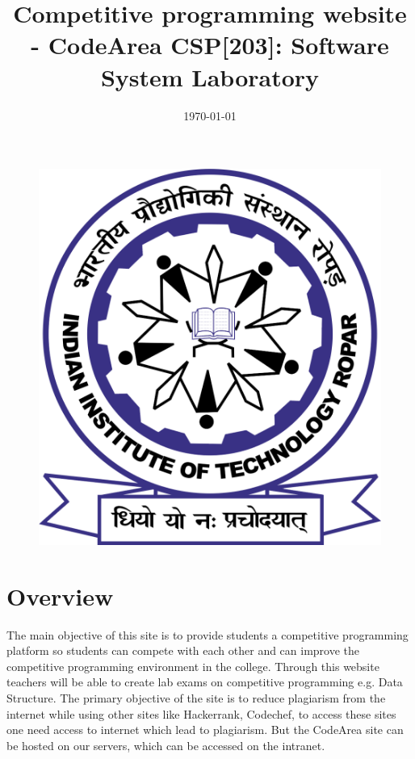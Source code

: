 \documentclass{article}
\title{Competitive programming website - CodeArea
        CSP[203]: Software System Laboratory}
\date{\today}
\begin{document}
\maketitle

\begin{table}[h!]
    \begin{center}
    \end{center}
\end{table}

\vspace{2cm}

\begin{figure}[h!]
    \centering
    \includegraphics[width=0.4\linewidth]{rpr_logo.jpg}
\end{figure}


\newpage


\section{Overview}
The main objective of this site is to provide students a competitive programming platform so students can compete with each other and can improve the competitive programming environment in the college. Through this website teachers will be able to create lab exams on competitive programming e.g. Data Structure.
The primary objective of the site is to reduce plagiarism from the internet while using other sites like Hackerrank, Codechef, to access these sites one need access to internet which lead to plagiarism. But the CodeArea site can be hosted on our servers, which can be accessed on the intranet.
\end{document}
